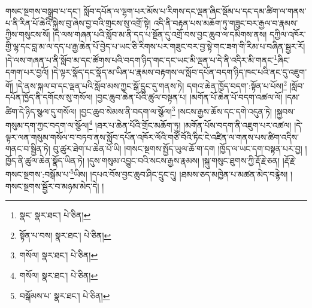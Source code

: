 གསང་སྔགས་བསྒྲུབ་པ་དང་། སློབ་དཔོན་ལ་ལྷག་པར་མོས་པ་རིགས་དང་ལྡན་ཞིང་སྡོམ་པ་དང་དམ་ཚིག་ལ་གནས་པ་ནི་རིན་པོ་ཆེའི་སྐྱེས་བུ་ཞེས་བྱ་བའི་གྲངས་སུ་འགྲོ་སྟེ། འདི་ནི་བརྟན་པས་མཆོག་ཏུ་གཟུང་བར་རྒྱལ་བ་རྣམས་ཀྱིས་གསུངས་སོ། །དེ་ལས་གཞན་པའི་སློབ་མ་ནི་དད་པ་སྔོན་དུ་འགྲོ་བས་བྱང་ཆུབ་ལ་དམིགས་ནས། དཀྱིལ་འཁོར་གྱི་ལྷ་དང་བླ་མ་ལ་དད་པ་རྒྱ་ཆེན་པོ་བྱེད་པ་ཡང་ཅི་རིགས་པར་གཟུང་བར་བྱ་སྟེ་གང་ཟག་གི་རིམ་པ་བཞིན་སྦྱར་རོ། །དེ་ལས་གཞན་པ་ནི་སློབ་མ་དང་ཚོགས་པའི་བདག་ཉིད་གང་དང་ཡང་མི་ལྡན་པ་དེ་ནི་འདིར་མི་གནང་\footnote{སྣང་  སྣར་ཐང་།  པེ་ཅིན། }ཞིང་དགག་པར་བྱའོ། །དེ་ལྟར་སྣོད་དང་སྣོད་མ་ཡིན་པ་རྣམས་བརྟགས་ལ་སློབ་དཔོན་བདག་ཉིད་ཁང་པའི་ནང་དུ་འཇུག་གོ། །དེ་ནས་སྐལ་བ་དང་ལྡན་པའི་སློབ་མས་ཀྱང་སྒོ་དྲུང་དུ་གནས་ཏེ། དགའ་ཆེན་ཁྱོད་བདག་:སྟོན་པ་པོས།\footnote{སྟོན་པ་བས།  སྣར་ཐང་།  པེ་ཅིན། } །སློབ་དཔོན་ཁྱོད་ནི་དགོངས་སུ་གསོལ། །བྱང་ཆུབ་ཆེན་པོའི་ཚུལ་བསྟན་པ། །མགོན་པོ་ཆེན་པོ་བདག་འཚལ་ལོ། །དམ་ཚིག་དེ་ཉིད་སྩལ་དུ་གསོལ། །བྱང་ཆུབ་སེམས་ནི་བདག་ལ་སྩོལ།\footnote{གསོལ།  སྣར་ཐང་།  པེ་ཅིན། } །སངས་རྒྱས་ཆོས་དང་དགེ་འདུན་ཏེ། །སྐྱབས་གསུམ་དག་ཀྱང་བདག་ལ་སྩོལ།\footnote{གསོལ།  སྣར་ཐང་།  པེ་ཅིན། } །ཐར་པ་ཆེན་པོའི་གྲོང་མཆོག་ཏུ། །མགོན་པོས་བདག་ནི་འཇུག་པར་འཚལ། །དེ་ལྟར་ལན་གསུམ་གསོལ་བ་བཏབ་ནས་སློབ་དཔོན་འཁོར་ལོའི་གཙོ་བོའི་ཏིང་ངེ་འཛིན་ལ་གནས་པས་ཚིག་འདིས་གནང་བ་སྦྱིན་ཏེ། བུ་ཚུར་ཐེག་པ་ཆེན་པོ་ཡི། །གསང་སྔགས་སྤྱོད་ཡུལ་ཆོ་ག་དག །ཁྱོད་ལ་ཡང་དག་བསྟན་པར་བྱ། །ཁྱོད་ནི་ཚུལ་ཆེན་སྣོད་ཡིན་ཏེ། །དུས་གསུམ་འབྱུང་བའི་སངས་རྒྱས་རྣམས། །སྐུ་གསུང་ཐུགས་ཀྱི་རྡོ་རྗེ་ཅན། །རྡོ་རྗེ་གསང་སྔགས་:བསྒོམ་པ་\footnote{བསྒོམས་པ་  སྣར་ཐང་།  པེ་ཅིན། }ཡིས། །དཔའ་བོས་བྱང་ཆུབ་ཤིང་དྲུང་དུ། །ཐམས་ཅད་མཁྱེན་པ་མཚན་མེད་བརྙེས། །གསང་སྔགས་སྦྱོར་བ་མཉམ་མེད་དེ། །
